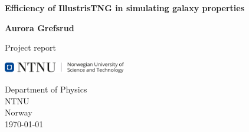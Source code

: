 \begin{titlepage}
   \begin{center}
       \vspace*{1cm}

       \textbf{Efficiency of IllustrisTNG in simulating galaxy properties}
    
       \vspace{1.5cm}

       \textbf{Aurora Grefsrud}

       \vfill
            
       Project report\\
            
       \vspace{0.8cm}
     
       \includegraphics[width=0.4\textwidth]{images/ntnu.png}
            
       Department of Physics\\
       NTNU\\
       Norway\\
       \today
            
   \end{center}
\end{titlepage}